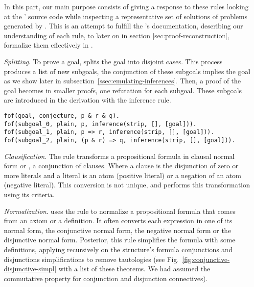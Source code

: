 \documentclass[../main.tex]{subfiles}
\begin{document}

In this part, our main purpose consists of giving a response to
these rules looking at the \Metis' source code while inspecting a
representative set of solutions of \CPL problems
\cite{Prieto-Cubides2017}generated by \Metis.
This is an attempt to fulfill the \Metis's documentation,
describing our understanding of each rule, to later on in section
\ref{sec:proof-reconstruction}, formalize them effectively in \Agda.

\vskip 2mm


\textit{Splitting}. To prove a goal, \Metis splits the goal into
disjoint cases. This process produces a list of new subgoals, the
conjunction of these subgoals implies the goal as we show later in
subsection~\ref{ssec:emulating-inferences}. Then, a proof of the
goal becomes in smaller proofs, one refutation for each subgoal.
These subgoals are introduced in the \TSTP derivation with the \strip
inference rule.

\begin{verbatim}
fof(goal, conjecture, p & r & q).
fof(subgoal_0, plain, p, inference(strip, [], [goal])).
fof(subgoal_1, plain, p => r, inference(strip, [], [goal])).
fof(subgoal_2, plain, (p & r) => q, inference(strip, [], [goal])).
\end{verbatim}


\textit{Clausification.} The \clausify rule transforms a
propositional formula in clausal normal form or \CNF, a conjunction
of clauses. Where a clause is the disjunction of zero or more
literals and a literal is an atom (positive literal) or a negation
of an atom (negative literal). This conversion is not unique, and
\Metis performs this transformation using its criteria.


\textit{Normalization.} \Metis uses the \canonicalize rule to
normalize a propositional formula that comes from an axiom or a
definition. It often converts each expression in one of its normal
form, the conjunctive normal form, the negative normal form or the
disjunctive normal form. Posterior, this rule simplifies the formula
with some definitions, applying recursively on the structure's
formula conjunctions and disjunctions simplifications to remove
tautologies (see Fig.~\ref{fig:conjunctive-disjunctive-simpl} with a
list of these theorems. We had assumed the commutative property for
conjunction and disjunction connectives).
\end{document}
